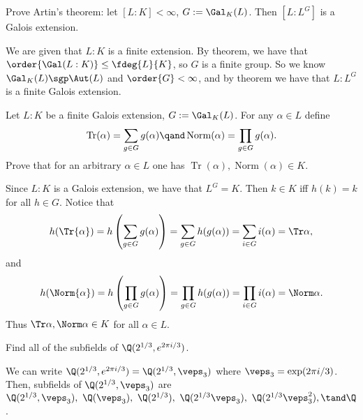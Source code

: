 \documentclass{article}
\begin{document}
\begin{exercise} \label{qs:3} %
Prove Artin's theorem: let \( [L : K] < \infty \), \( G := \Gal_K(L) \). Then \( [L : L^G] \) is a Galois extension.
\end{exercise}
\begin{solution}
We are given that \( L:K \) is a finite extension.
By theorem, we have that \( \order{\Gal(L:K)} \leq \fdeg{L}{K} \), so \( G \) is a finite group.
So we know \( \Gal_K(L)\sgp \Aut(L) \) and \( \order{G} < \infty \), and by theorem we have that \( L:L^G \) is a finite Galois extension.
\end{solution}

\begin{exercise} \label{qs:4} %
Let \( L : K \) be a finite Galois extension, \( G := \Gal_K(L) \). For any \( \alpha \in L \) define
\begin{align*}
\operatorname{Tr}(\alpha) = \sum_{g \in G} g(\alpha) \qand \operatorname{Norm}(\alpha) = \prod_{g \in G} g(\alpha).
\end{align*}
Prove that for an arbitrary \( \alpha \in L \) one has \( \operatorname{Tr}(\alpha), \operatorname{Norm}(\alpha) \in K \).
\end{exercise}
\begin{solution}
Since \( L:K \) is a Galois extension, we have that \( L^G = K \).
Then \( k\in K \) iff \( h(k) = k \) for all \( h\in G \).
Notice that
\begin{align*}
  h(\Tr{\alpha}) = h\left( \sum_{g\in G}g(\alpha) \right) = \sum_{g\in G} h(g(\alpha)) = \sum_{i\in G} i(\alpha) = \Tr\alpha,
\end{align*}
and
\begin{align*}
  h(\Norm{\alpha}) = h\left( \prod_{g\in G}g(\alpha) \right) = \prod_{g\in G} h(g(\alpha)) = \prod_{i\in G} i(\alpha) = \Norm\alpha.
\end{align*}
Thus \( \Tr \alpha,\Norm\alpha\in K \) for all \( \alpha\in L \).
\end{solution}

\begin{subexercise} \label{qs:5a} %
Find all of the subfields of \( \Q(2^{1/3}, e^{2\pi i / 3}) \).
\end{subexercise}
\begin{solution}
We can write \( \Q(2^{1/3}, e^{2\pi i / 3}) = \Q(2^{1/3}, \veps_3) \) where \( \veps_3 = \exp(2\pi i / 3) \).
Then, subfields of \( \Q(2^{1/3}, \veps_3) \) are \( \Q(2^{1/3}, \veps_3),\ \Q(\veps_3),\ \Q(2^{1/3}),\ \Q(2^{1/3}\veps_3),\ \Q(2^{1/3}\veps_3^2),\tand \Q \).
\end{solution}
\end{document}
